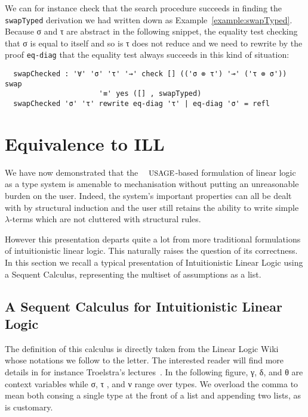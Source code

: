 \documentclass[a4paper,UKenglish]{lipics-v2016}
\begin{document}
\begin{example}We can for instance check that the search procedure
succeeds in finding the \texttt{swapTyped} derivation we had written down
as Example~\ref{example:swapTyped}. Because σ and τ are abstract in the
following snippet, the equality test checking that σ is equal to itself
and so is τ does not reduce and we need to rewrite by the proof
\texttt{eq-diag} that the equality test always succeeds in this kind of
situation:
\begin{lstlisting}
  swapChecked : '∀' 'σ' 'τ' '→' check [] (('σ ⊗ τ') '⊸' ('τ ⊗ σ')) swap
                      '≡' yes ([] , swapTyped)
  swapChecked 'σ' 'τ' rewrite eq-diag 'τ' | eq-diag 'σ' = refl
\end{lstlisting}
\end{example}



\section{Equivalence to ILL}\label{sec:equivalence}

We have now demonstrated that the $\Usages{}$-based formulation of
linear logic as a type system is amenable to mechanisation without
putting an unreasonable burden on the user. Indeed, the system's
important properties can all be dealt with by structural induction
and the user still retains the ability to write simple $λ$-terms
which are not cluttered with structural rules.

However this presentation departs quite a lot from more traditional
formulations of intuitionistic linear logic. This naturally raises
the question of its correctness. In this section we recall a typical
presentation of Intuitionistic Linear Logic using a Sequent Calculus,
representing the multiset of assumptions as a list.

\subsection{A Sequent Calculus for Intuitionistic Linear Logic}

The definition of this calculus is directly taken from the Linear Logic
Wiki~\cite{wiki:linearlogic} whose notations we follow to the letter.
The interested reader will find more details in for instance Troelstra's
lectures~\cite{troelstra1991lectures}. In the following figure, γ, δ,
and θ are context variables while σ, τ , and ν range over types. We
overload the comma to mean both consing a single type at the front
of a list and appending two lists, as is customary.
\end{document}

